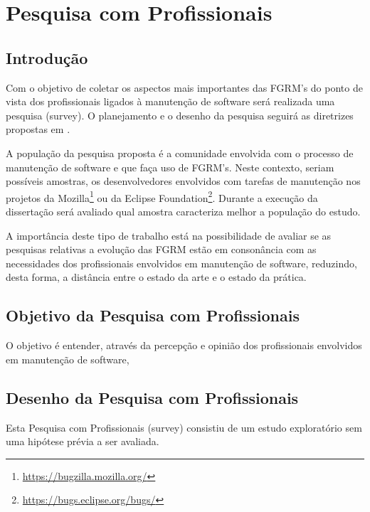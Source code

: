 
\chapter{Pesquisa com Profissionais}
\label{ch:pesquisa-profissionais}

\section{Introdução}
\label{sec:pesquisa-profissionais-intro}


Com o objetivo de coletar os aspectos mais importantes das FGRM's do ponto de
vista dos profissionais ligados à manutenção de software será realizada uma
 pesquisa (survey). O planejamento e o desenho da pesquisa seguirá as diretrizes propostas em \cite{wohlin2012experimentation}.

A população da pesquisa proposta é a comunidade envolvida com o processo de
manutenção de software e que faça uso de FGRM's. Neste contexto, seriam
possíveis amostras, os desenvolvedores envolvidos com tarefas de manutenção nos
projetos da Mozilla\footnote{\url{https://bugzilla.mozilla.org/}} ou da
Eclipse Foundation\footnote{\url{https://bugs.eclipse.org/bugs/}}. Durante a
execução da dissertação será avaliado qual amostra caracteriza melhor a
população do estudo.

A importância deste tipo de trabalho está na possibilidade de avaliar se as pesquisas relativas a
evolução das FGRM estão em consonância com as necessidades dos profissionais envolvidos em
manutenção de software, reduzindo, desta forma, a distância entre o estado da arte e o estado da
prática.
\section{Objetivo da Pesquisa com Profissionais}
\label{sec:objetivo_da_pesquisa_com_profissionais}

O objetivo é entender, através da  percepção e opinião dos profissionais envolvidos em manutenção de
software, 


\section{Desenho da Pesquisa com Profissionais}
\label{sec:desenho_da_pesquisa_com_profissionais}

Esta Pesquisa com Profissionais (survey) consistiu de um estudo exploratório sem uma hipótese prévia
a ser avaliada.


